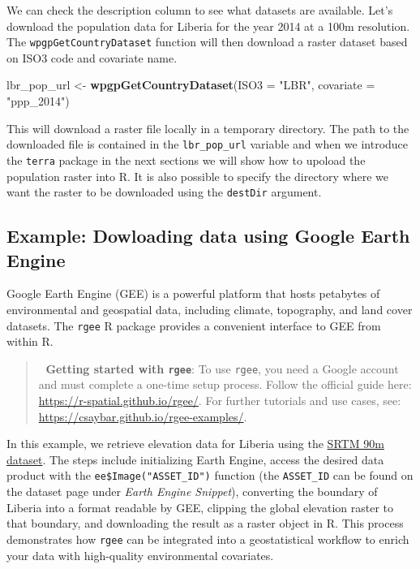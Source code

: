 \documentclass[
  letterpaper,
]{krantz}
\newenvironment{Shaded}{\begin{snugshade}}{\end{snugshade}}
\newcommand{\AttributeTok}[1]{\textcolor[rgb]{0.13,0.29,0.53}{#1}}
\newcommand{\FunctionTok}[1]{\textcolor[rgb]{0.13,0.29,0.53}{\textbf{#1}}}
\newcommand{\NormalTok}[1]{#1}
\newcommand{\OtherTok}[1]{\textcolor[rgb]{0.56,0.35,0.01}{#1}}
\newcommand{\StringTok}[1]{\textcolor[rgb]{0.31,0.60,0.02}{#1}}
\begin{document}
We can check the description column to see what datasets are available.
Let's download the population data for Liberia for the year 2014 at a
100m resolution. The \texttt{wpgpGetCountryDataset} function will then
download a raster dataset based on ISO3 code and covariate name.

\begin{Shaded}
\begin{Highlighting}[]
\NormalTok{lbr\_pop\_url }\OtherTok{\textless{}{-}} \FunctionTok{wpgpGetCountryDataset}\NormalTok{(}\AttributeTok{ISO3 =} \StringTok{"LBR"}\NormalTok{, }\AttributeTok{covariate =} \StringTok{"ppp\_2014"}\NormalTok{) }
\end{Highlighting}
\end{Shaded}

This will download a raster file locally in a temporary directory. The
path to the downloaded file is contained in the \texttt{lbr\_pop\_url}
variable and when we introduce the \texttt{terra} package in the next
sections we will show how to upoload the population raster into R. It is
also possible to specify the directory where we want the raster to be
downloaded using the \texttt{destDir} argument.

\subsection{Example: Dowloading data using Google Earth
Engine}\label{example-dowloading-data-using-google-earth-engine}

Google Earth Engine (GEE) is a powerful platform that hosts petabytes of
environmental and geospatial data, including climate, topography, and
land cover datasets. The \texttt{rgee} R package provides a convenient
interface to GEE from within R.

\begin{quote}
🔗 \textbf{Getting started with \texttt{rgee}}: To use \texttt{rgee},
you need a Google account and must complete a one-time setup process.
Follow the official guide here: \url{https://r-spatial.github.io/rgee/}.
For further tutorials and use cases, see:
\url{https://csaybar.github.io/rgee-examples/}.
\end{quote}

In this example, we retrieve elevation data for Liberia using the
\href{https://developers.google.com/earth-engine/datasets/catalog/CGIAR_SRTM90_V4}{SRTM
90m dataset}. The steps include initializing Earth Engine, access the
desired data product with the \texttt{ee\$Image("ASSET\_ID")} function
(the \texttt{ASSET\_ID} can be found on the dataset page under
\emph{Earth Engine Snippet}), converting the boundary of Liberia into a
format readable by GEE, clipping the global elevation raster to that
boundary, and downloading the result as a raster object in R. This
process demonstrates how \texttt{rgee} can be integrated into a
geostatistical workflow to enrich your data with high-quality
environmental covariates.
\end{document}
